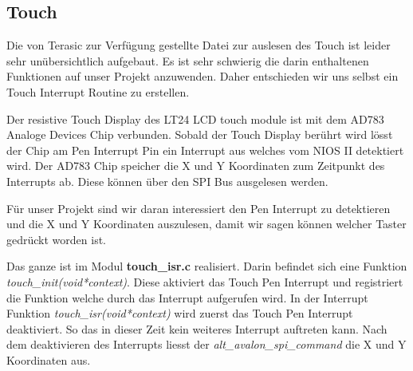 \subsection{Touch}\label{subsec:touch}
 Die von Terasic zur Verfügung gestellte Datei zur auslesen des Touch ist leider sehr unübersichtlich aufgebaut. Es ist sehr schwierig die darin enthaltenen Funktionen auf unser Projekt anzuwenden. Daher entschieden wir uns selbst ein Touch Interrupt Routine zu erstellen. 
 
 Der resistive Touch Display des LT24 LCD touch module ist mit dem AD783 Analoge Devices Chip verbunden. Sobald der Touch Display berührt wird lösst der Chip am Pen Interrupt Pin ein Interrupt aus welches vom NIOS II detektiert wird. Der AD783 Chip speicher die X und Y Koordinaten zum Zeitpunkt des Interrupts ab. Diese können über den SPI Bus ausgelesen werden\cite{AD7843}. 
 
 Für unser Projekt sind wir daran interessiert den Pen Interrupt zu detektieren und die X und Y Koordinaten auszulesen, damit wir sagen können welcher Taster gedrückt worden ist.
 
Das ganze ist im Modul \textbf{touch\_isr.c} realisiert. Darin befindet sich eine Funktion \textit{touch\_init(void*context)}. Diese aktiviert das Touch Pen Interrupt  und registriert die Funktion welche durch das Interrupt aufgerufen wird. 
In der Interrupt Funktion \textit{touch\_isr(void*context)} wird zuerst das Touch Pen Interrupt  deaktiviert. So das in dieser Zeit kein weiteres Interrupt auftreten kann. Nach dem deaktivieren des Interrupts liesst der \textit{alt\_avalon\_spi\_command} die X und Y Koordinaten aus.